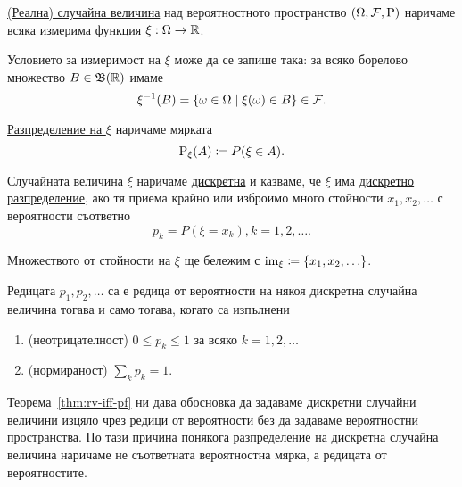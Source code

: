 \documentclass[numbers=endperiod, DIV=15, bibliography=totocnumbered]{scrartcl}
\begin{document}
\begin{definition}
  \underline{(Реална) случайна величина} над вероятностното пространство $(\Omega, \mathcal{F}, \operatorname{P})$ наричаме всяка измерима функция $\xi : \Omega \to \mathbb{R}$.

  Условието за измеримост на $\xi$ може да се запише така: за всяко борелово множество $B \in \mathfrak{B}(\mathbb{R})$ имаме
  \begin{displaymath}
    \xi^{-1} (B) = \{ \omega \in \Omega \mid \xi(\omega) \in B \} \in \mathcal{F}.
  \end{displaymath}

  \underline{Разпределение на $\xi$} наричаме мярката
  \begin{displaymath}
    \operatorname{P}_\xi(A) \coloneqq P(\xi \in A).
  \end{displaymath}

  Случайната величина $\xi$ наричаме \underline{дискретна} и казваме, че $\xi$ има \underline{дискретно разпределение}, ако тя приема крайно или изброимо много стойности $x_1, x_2, \ldots$ с вероятности съответно
  \begin{displaymath}
    p_k = P(\xi = x_k), k = 1, 2, \ldots.
  \end{displaymath}

  Множеството от стойности на $\xi$ ще бележим с $\operatorname{im}_\xi \coloneqq \{ x_1, x_2, \ldots \}$.
\end{definition}

\begin{theorem}\label{thm:rv-iff-pf}
  Редицата $p_1, p_2, \ldots$ са е редица от вероятности на някоя дискретна случайна величина тогава и само тогава, когато са изпълнени
  \begin{enumerate}
    \item\label{thm:rv-iff-pf.bounded} (неотрицателност) $0 \leq p_k \leq 1$ за всяко $k = 1, 2, \ldots$
    \item\label{thm:rv-iff-pf.normed} (нормираност) $\sum_k p_k = 1$.
  \end{enumerate}
\end{theorem}

Теорема~\ref{thm:rv-iff-pf} ни дава обосновка да задаваме дискретни случайни величини изцяло чрез редици от вероятности без да задаваме вероятностни пространства. По тази причина понякога разпределение на дискретна случайна величина наричаме не съответната вероятностна мярка, а редицата от вероятностите.
\end{document}
